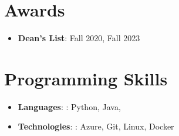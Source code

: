 \documentclass[letterpaper,11pt]{article}
\newcommand{\resumeItem}[2]{
  \item\small{
    \textbf{#1}{: #2 \vspace{-0pt}}
  }
}
\newcommand{\resumeItemListStart}{\begin{itemize}}
\newcommand{\resumeItemListEnd}{\end{itemize}\vspace{-0pt}}
\begin{document}
\section{Awards}
 \resumeItemListStart
 \resumeItem{Dean's List}
   {Fall 2020, Fall 2023}
 \resumeItemListEnd
\section{Programming Skills}
 \resumeItemListStart
  \resumeItem{Languages}{: Python, Java, }
  \resumeItem{Technologies}{: Azure, Git, Linux, Docker}
 \resumeItemListEnd


\end{document}
